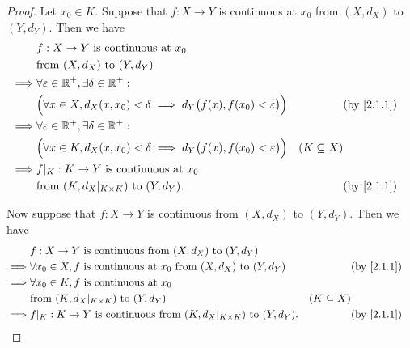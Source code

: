 \begin{proof}
  Let \(x_0 \in K\).
  Suppose that \(f : X \to Y\) is continuous at \(x_0\) from \((X, d_X)\) to \((Y, d_Y)\).
  Then we have
  \begin{align*}
             & f : X \to Y \text{ is continuous at } x_0                                                                                       \\
             & \text{from } (X, d_X) \text{ to } (Y, d_Y)                                                                                      \\
    \implies & \forall \varepsilon \in \R^+, \exists \delta \in \R^+ :                                                                         \\
             & \Big(\forall x \in X, d_X(x, x_0) < \delta \implies d_Y\big(f(x), f(x_0) < \varepsilon\big)\Big) &                 & \by{2.1.1} \\
    \implies & \forall \varepsilon \in \R^+, \exists \delta \in \R^+ :                                                                         \\
             & \Big(\forall x \in K, d_X(x, x_0) < \delta \implies d_Y\big(f(x), f(x_0) < \varepsilon\big)\Big) & (K \subseteq X)              \\
    \implies & f|_K : K \to Y \text{ is continuous at } x_0                                                                                    \\
             & \text{from } (K, d_X|_{K \times K}) \text{ to } (Y, d_Y).                                        &                 & \by{2.1.1}
  \end{align*}

  Now suppose that \(f : X \to Y\) is continuous from \((X, d_X)\) to \((Y, d_Y)\).
  Then we have
  \begin{align*}
             & f : X \to Y \text{ is continuous from } (X, d_X) \text{ to } (Y, d_Y)                                                         \\
    \implies & \forall x_0 \in X, f \text{ is continuous at } x_0 \text{ from } (X, d_X) \text{ to } (Y, d_Y) &                 & \by{2.1.1} \\
    \implies & \forall x_0 \in K, f \text{ is continuous at } x_0                                                                            \\
             & \text{from } (K, d_X|_{K \times K}) \text{ to } (Y, d_Y)                                       & (K \subseteq X)              \\
    \implies & f|_K : K \to Y \text{ is continuous from } (K, d_X|_{K \times K}) \text{ to } (Y, d_Y).        &                 & \by{2.1.1}
  \end{align*}
\end{proof}

